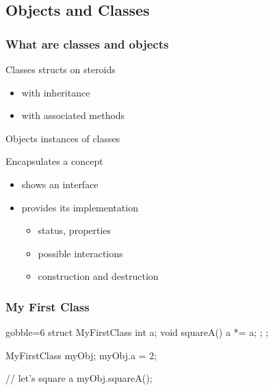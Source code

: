 
\subsection{Objects and Classes}

\begin{frame}[fragile]
  \frametitle{What are classes and objects}
  \begin{block}{Classes}
    structs on steroids
    \begin{itemize}
    \item with inheritance
    \item with associated methods
    \end{itemize}
  \end{block}
  \begin{block}{Objects}
    instances of classes
  \end{block}
  \begin{block}{Encapsulates a concept}
    \begin{itemize}
    \item shows an interface
    \item provides its implementation
      \begin{itemize}
      \item status, properties
      \item possible interactions
      \item construction and destruction
      \end{itemize}    
    \end{itemize}    
  \end{block}
\end{frame}


\begin{frame}[fragile]
  \frametitle{My First Class}
  \begin{multicols}{2}
    \begin{cppcode*}{gobble=6}
      struct MyFirstClass {
        int a;
        void squareA() {
          a *= a;
        };
      };

      MyFirstClass myObj;
      myObj.a = 2;

      // let's square a
      myObj.squareA();
    \end{cppcode*}
    \columnbreak
    \null \vfill
    \vfill \null
  \end{multicols}
\end{frame}




